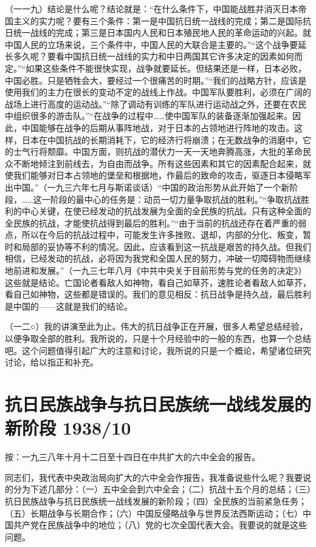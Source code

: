 \documentclass[UTF8, 12pt, a4paper]{ctexrep}
\begin{document}
（一一九）结论是什么呢？结论就是：“在什么条件下，中国能战胜并消灭日本帝国主义的实力呢？要有三个条件：第一是中国抗日统一战线的完成；第二是国际抗日统一战线的完成；第三是日本国内人民和日本殖民地人民的革命运动的兴起。就中国人民的立场来说，三个条件中，中国人民的大联合是主要的。”“这个战争要延长多久呢？要看中国抗日统一战线的实力和中日两国其它许多决定的因素如何而定。”“如果这些条件不能很快实现，战争就要延长。但结果还是一样，日本必败，中国必胜。只是牺牲会大，要经过一个很痛苦的时期。”“我们的战略方针，应该是使用我们的主力在很长的变动不定的战线上作战。中国军队要胜利，必须在广阔的战场上进行高度的运动战。”“除了调动有训练的军队进行运动战之外，还要在农民中组织很多的游击队。”“在战争的过程中……使中国军队的装备逐渐加强起来。因此，中国能够在战争的后期从事阵地战，对于日本的占领地进行阵地的攻击。这样，日本在中国抗战的长期消耗下，它的经济行将崩溃；在无数战争的消磨中，它的士气行将颓靡。中国方面，则抗战的潜伏力一天一天地奔腾高涨，大批的革命民众不断地倾注到前线去，为自由而战争。所有这些因素和其它的因素配合起来，就使我们能够对日本占领地的堡垒和根据地，作最后的致命的攻击，驱逐日本侵略军出中国。”（一九三六年七月与斯诺谈话）“中国的政治形势从此开始了一个新阶段，……这一阶段的最中心的任务是：动员一切力量争取抗战的胜利。”“争取抗战胜利的中心关键，在使已经发动的抗战发展为全面的全民族的抗战。只有这种全面的全民族的抗战，才能使抗战得到最后的胜利。”“由于当前的抗战还存在着严重的弱点，所以在今后的抗战过程中，可能发生许多挫败、退却，内部的分化、叛变，暂时和局部的妥协等不利的情况。因此，应该看到这一抗战是艰苦的持久战。但我们相信，已经发动的抗战，必将因为我党和全国人民的努力，冲破一切障碍物而继续地前进和发展。”（一九三七年八月《中共中央关于目前形势与党的任务的决定》）这些就是结论。亡国论者看敌人如神物，看自己如草芥，速胜论者看敌人如草芥，看自己如神物，这些都是错误的。我们的意见相反：抗日战争是持久战，最后胜利是中国的——这就是我们的结论。

（一二○）我的讲演至此为止。伟大的抗日战争正在开展，很多人希望总结经验，以便争取全部的胜利。我所说的，只是十个月经验中的一般的东西，也算一个总结吧。这个问题值得引起广大的注意和讨论，我所说的只是一个概论，希望诸位研究讨论，给以指正和补充。

\section{抗日民族战争与抗日民族统一战线发展的新阶段 1938/10}

按：一九三八年十月十二日至十四日在中共扩大的六中全会的报告。

同志们，我代表中央政治局向扩大的六中全会作报告，我准备说些什么呢？我要说的分为下述几部分：（一）五中全会到六中全会；（二）抗战十五个月的总结；（三）抗日民族战争与抗日民族统一战线发展的新阶段；（四）全民族的当前紧急任务；（五）长期战争与长期合作；（六）中国反侵略战争与世界反法西斯运动；（七）中国共产党在民族战争中的地位；（八）党的七次全国代表大会。我要说的就是这些问题。
\end{document}
